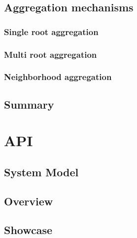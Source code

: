 \subsection{Aggregation mechanisms}

\subsubsection{Single root aggregation}

\subsubsection{Multi root aggregation}

\subsubsection{Neighborhood aggregation}

\subsection{Summary}

\section{API}

\subsection{System Model}

\subsection{Overview}

\subsection{Showcase}